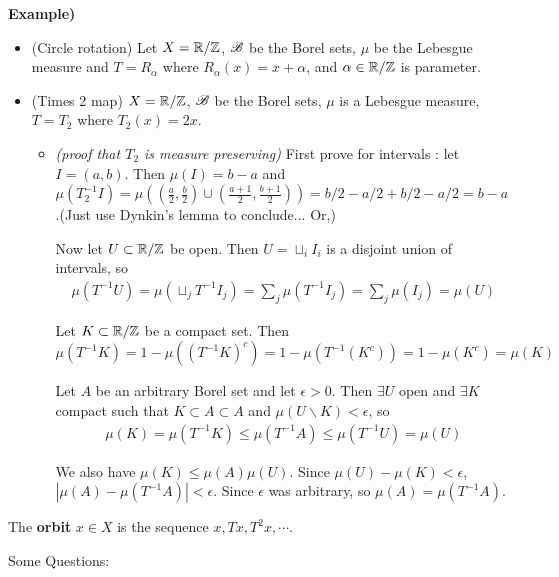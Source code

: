 \documentclass[10pt,a4paper]{report}
\begin{document}
\textbf{Example)}

\begin{itemize}
\item (Circle rotation) Let $X = \mathbb{R}/ \mathbb{Z}$, $\mathscr{B}$ be the Borel sets, $\mu$ be the Lebesgue measure and $T = R_{\alpha}$ where $R_{\alpha}(x) = x+\alpha$, and $\alpha \in \mathbb{R}/\mathbb{Z}$ is parameter.

\item (Times 2 map) $X = \mathbb{R}/\mathbb{Z}$, $\mathscr{B}$ be the Borel sets, $\mu$ is a Lebesgue measure, $T = T_2$ where $T_2(x) = 2x$.

\begin{itemize}
\item[ ] \textsl{(proof that $T_2$ is measure preserving)} First prove for intervals : let $I = (a,b)$. Then $\mu(I) = b-a$ and $\mu(T_2^{-1} I)= \mu((\frac{a}{2},\frac{b}{2}) \cup (\frac{a+1}{2},\frac{b+1}{2})) = b/2 - a/2 + b/2 - a/2 = b-a$.(Just use Dynkin's lemma to conclude... Or,)

Now let $U \subset \mathbb{R} / \mathbb{Z}$ be open. Then $U = \sqcup_{i} I_i$ is a disjoint union of intervals, so
\begin{align*}
\mu(T^{-1}U) = \mu(\sqcup_j T^{-1}I_j) = \sum_j \mu(T^{-1} I_j) = \sum_{j} \mu(I_j) = \mu(U)
\end{align*}

Let $K \subset \mathbb{R}/\mathbb{Z}$ be a compact set. Then
\begin{equation*}
\mu(T^{-1}K) = 1- \mu((T^{-1}K)^c) = 1- \mu(T^{-1}(K^c)) = 1- \mu(K^c) = \mu(K)
\end{equation*}

Let $A$ be an arbitrary Borel set and let $\epsilon >0$. Then $\exists U$ open and $\exists K$ compact such that $K\subset A \subset A$ and $\mu(U \backslash K) < \epsilon$, so
\begin{align*}
\mu(K) = \mu(T^{-1} K) \leq \mu(T^{-1} A) \leq \mu(T^{-1} U) = \mu(U)
\end{align*}

We also have $\mu(K) \leq \mu(A) \mu(U)$. Since $\mu(U) - \mu(K) < \epsilon$, $|\mu(A) - \mu(T^{-1}A) | < \epsilon$. Since $\epsilon$ was arbitrary, so $\mu(A) = \mu(T^{-1} A)$.

\eop
\end{itemize}
\end{itemize}
\s

The \textbf{orbit} $x \in X$ is the sequence $x, Tx, T^2 x, \cdots$.
\s

Some Questions:
\end{document}

